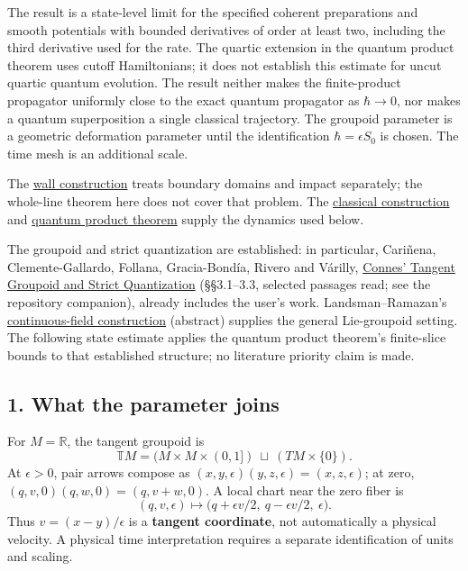 \documentclass[11pt,a4paper]{article}
\begin{document}
The result is a state-level limit for the specified coherent
preparations and smooth potentials with bounded derivatives of order at
least two, including the third derivative used for the rate. The quartic
extension in the quantum product theorem uses cutoff Hamiltonians; it
does not establish this estimate for uncut quartic quantum evolution.
The result neither makes the finite-product propagator uniformly close
to the exact quantum propagator as \(\hbar\to0\), nor makes a quantum
superposition a single classical trajectory. The groupoid parameter is a
geometric deformation parameter until the identification
\(\hbar=\epsilon
S_0\) is chosen. The time mesh is an additional scale.

The \href{dirichlet-wall-impulse.md}{wall construction} treats boundary
domains and impact separately; the whole-line theorem here does not
cover that problem. The \href{balaban-ode-lesson.md}{classical
construction} and \href{quantum-blocks-construct-newton.md}{quantum
product theorem} supply the dynamics used below.

The groupoid and strict quantization are established: in particular,
Cariñena, Clemente-Gallardo, Follana, Gracia-Bondía, Rivero and Várilly,
\href{https://arxiv.org/abs/math/9802102}{Connes' Tangent Groupoid and
Strict Quantization} (§§3.1--3.3, selected passages read; see the
repository companion), already includes the user's work.
Landsman--Ramazan's
\href{https://arxiv.org/abs/math-ph/0001005}{continuous-field
construction} (abstract) supplies the general Lie-groupoid setting. The
following state estimate applies the quantum product theorem's
finite-slice bounds to that established structure; no literature
priority claim is made.

\subsection{1. What the parameter joins}\label{what-the-parameter-joins}

For \(M=\mathbb R\), the tangent groupoid is \[
 \mathbb T M=(M\times M\times(0,1])\ \sqcup\ (TM\times\{0\}).
 \tag{1}
\] At \(\epsilon>0\), pair arrows compose as
\((x,y,\epsilon)(y,z,\epsilon)=(x,z,\epsilon)\); at zero,
\((q,v,0)(q,w,0)=(q,v+w,0)\). A local chart near the zero fiber is \[
 (q,v,\epsilon)\longmapsto
 \big(q+\epsilon v/2,\ q-\epsilon v/2,\ \epsilon\big).
 \tag{2}
\] Thus \(v=(x-y)/\epsilon\) is a \textbf{tangent coordinate}, not
automatically a physical velocity. A physical time interpretation
requires a separate identification of units and scaling.
\end{document}
